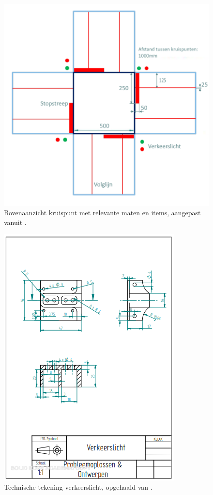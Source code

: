 \documentclass[a4paper,twoside,kulak]{kulakreport}
\begin{document}
	\begin{figure}[h]
		\centering
		\includegraphics[width=.8\textwidth]{bovenaanzichtkruispunt}
		\caption{Bovenaanzicht kruispunt met relevante maten en items, aangepast vanuit \cite{Smart}.
		}
		\label{fig: kruispunt}
		
	\end{figure}
\newpage
	\begin{figure}[h]
		\centering
		\includegraphics[width=.8\textwidth]{verkeerslicht}
		\caption{Technische tekening verkeerslicht, opgehaald van \cite{artikel1}. }
		\label{fig: verkeerslicht}
	\end{figure}
	
\end{document}
